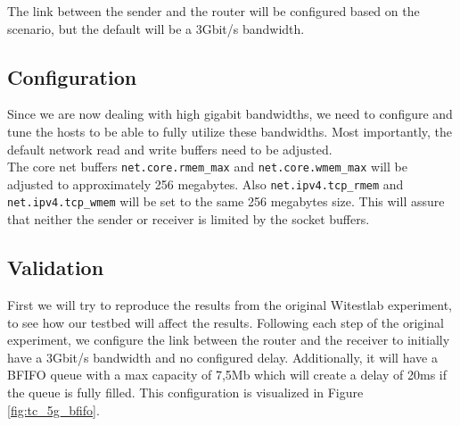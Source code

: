 \documentclass[a4paper,english, 12pt]{report}
\begin{document}
The link between the sender and the router will be configured based on the scenario, but the default will be a 3Gbit/s bandwidth.

\subsection{Configuration}
Since we are now dealing with high gigabit bandwidths, we need to configure and tune the hosts to be able to fully utilize these bandwidths. Most importantly, the default network read and write buffers need to be adjusted.\\

The core net buffers \verb|net.core.rmem_max| and \verb|net.core.wmem_max| will be adjusted to approximately 256 megabytes. Also \verb|net.ipv4.tcp_rmem| and \verb|net.ipv4.tcp_wmem| will be set to the same 256 megabytes size. This will assure that neither the sender or receiver is limited by the socket buffers.

\subsection{Validation}

First we will try to reproduce the results from the original Witestlab experiment, to see how our testbed will affect the results.
Following each step of the original experiment, we configure the link between the router and the receiver to initially have a 3Gbit/s bandwidth and no configured delay. Additionally, it will have a BFIFO queue with a max capacity of 7,5Mb which will create a delay of 20ms if the queue is fully filled. This configuration is visualized in Figure \ref{fig:tc_5g_bfifo}. \\
\end{document}

